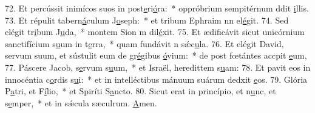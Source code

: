 72. Et percússit inimícos suos in post\uline{e}ri\uline{ó}ra:~* oppróbrium sempitérnum ddit \uline{i}llis.
73. Et répulit tabern\uline{á}culum J\uline{o}seph:~* et tribum Ephraim nn el\uline{é}git.
74. Sed elégit tr\uline{i}bum J\uline{u}da,~* montem Sion m dil\uline{é}xit.
75. Et ædificávit sicut unicórnium sanctifícium s\uline{u}um in t\uline{e}rra,~* quam fundávit n sǽc\uline{u}la.
76. Et elégit David, servum suum, et sústulit eum de gr\uline{é}gibus \uline{ó}vium:~* de post fœtántes accpit \uline{e}um,
77. Páscere Jacob, s\uline{e}rvum s\uline{u}um,~* et Israël, heredittem s\uline{u}am:
78. Et pavit eos in innocéntia c\uline{o}rdis s\uline{u}i:~* et in intelléctibus mánuum suárum dedxit \uline{e}os.
79. Glória P\uline{a}tri, et F\uline{í}lio,~* et Spiríti S\uline{a}ncto.
80. Sicut erat in princípio, et n\uline{u}nc, et s\uline{e}mper,~* et in sǽcula sæculrum. \uline{A}men.
